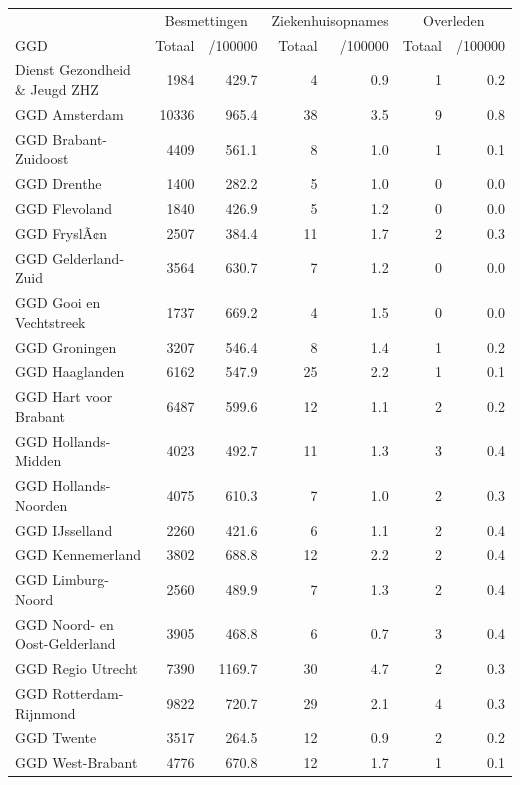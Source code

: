 \documentclass[
  english,
  man,floatsintext]{apa6}
\begin{document}
\begin{table}
\centering\begingroup\fontsize{10}{12}\selectfont

\begin{threeparttable}
\begin{tabular}{lrrrrrr}
\toprule
\multicolumn{1}{c}{ } & \multicolumn{2}{c}{Besmettingen} & \multicolumn{2}{c}{Ziekenhuisopnames} & \multicolumn{2}{c}{Overleden} \\
\cmidrule(l{3pt}r{3pt}){2-3} \cmidrule(l{3pt}r{3pt}){4-5} \cmidrule(l{3pt}r{3pt}){6-7}
GGD & Totaal & /100000 & Totaal & /100000 & Totaal & /100000\\
\midrule
Dienst Gezondheid \& Jeugd ZHZ & 1984 & 429.7 & 4 & 0.9 & 1 & 0.2\\
GGD Amsterdam & 10336 & 965.4 & 38 & 3.5 & 9 & 0.8\\
GGD Brabant-Zuidoost & 4409 & 561.1 & 8 & 1.0 & 1 & 0.1\\
GGD Drenthe & 1400 & 282.2 & 5 & 1.0 & 0 & 0.0\\
GGD Flevoland & 1840 & 426.9 & 5 & 1.2 & 0 & 0.0\\
GGD FryslÃ¢n & 2507 & 384.4 & 11 & 1.7 & 2 & 0.3\\
GGD Gelderland-Zuid & 3564 & 630.7 & 7 & 1.2 & 0 & 0.0\\
GGD Gooi en Vechtstreek & 1737 & 669.2 & 4 & 1.5 & 0 & 0.0\\
GGD Groningen & 3207 & 546.4 & 8 & 1.4 & 1 & 0.2\\
GGD Haaglanden & 6162 & 547.9 & 25 & 2.2 & 1 & 0.1\\
GGD Hart voor Brabant & 6487 & 599.6 & 12 & 1.1 & 2 & 0.2\\
GGD Hollands-Midden & 4023 & 492.7 & 11 & 1.3 & 3 & 0.4\\
GGD Hollands-Noorden & 4075 & 610.3 & 7 & 1.0 & 2 & 0.3\\
GGD IJsselland & 2260 & 421.6 & 6 & 1.1 & 2 & 0.4\\
GGD Kennemerland & 3802 & 688.8 & 12 & 2.2 & 2 & 0.4\\
GGD Limburg-Noord & 2560 & 489.9 & 7 & 1.3 & 2 & 0.4\\
GGD Noord- en Oost-Gelderland & 3905 & 468.8 & 6 & 0.7 & 3 & 0.4\\
GGD Regio Utrecht & 7390 & 1169.7 & 30 & 4.7 & 2 & 0.3\\
GGD Rotterdam-Rijnmond & 9822 & 720.7 & 29 & 2.1 & 4 & 0.3\\
GGD Twente & 3517 & 264.5 & 12 & 0.9 & 2 & 0.2\\
GGD West-Brabant & 4776 & 670.8 & 12 & 1.7 & 1 & 0.1\\

\end{tabular}
\end{threeparttable}
\end{table}
\end{document}
